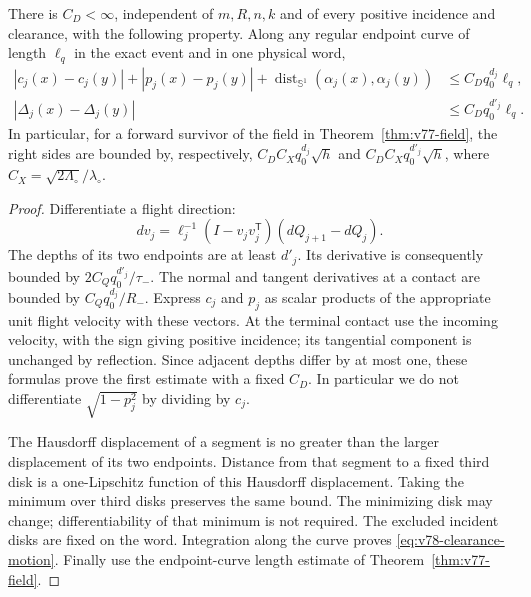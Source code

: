 \begin{theorem}
\label{thm:v78-margins}
There is $C_D<\infty$, independent of $m,R,n,k$ and of every
positive incidence and clearance, with the following property.
Along any regular endpoint curve of length $\ell_q$ in the exact
event and in one physical word,
\begin{align}
 |c_j(x)-c_j(y)|+|p_j(x)-p_j(y)|
      +\operatorname{dist}_{\mathbb S^1}(\alpha_j(x),\alpha_j(y))
       &\le C_Dq_0^{d_j}\ell_q,\label{eq:v78-contact-motion}\\
 |\Delta_j(x)-\Delta_j(y)|&\le C_Dq_0^{d'_j}\ell_q.
                                      \label{eq:v78-clearance-motion}
\end{align}
In particular, for a forward survivor of the field in
Theorem~\ref{thm:v77-field}, the right sides are bounded by,
respectively, $C_D C_Xq_0^{d_j}\sqrt h$ and
$C_D C_Xq_0^{d'_j}\sqrt h$, where
$C_X=\sqrt{2\Lambda_\circ}/\lambda_\circ$.
\end{theorem}
\begin{proof}
Differentiate a flight direction:
\[
 dv_j=\ell_j^{-1}(I-v_jv_j^{\mathsf T})(dQ_{j+1}-dQ_j).
\]
The depths of its two endpoints are at least $d'_j$. Its derivative
is consequently bounded by $2C_Qq_0^{d'_j}/\tau_-$.
The normal and tangent derivatives at a contact are bounded by
$C_Qq_0^{d_j}/R_-$. Express $c_j$ and $p_j$ as scalar products
of the appropriate unit flight velocity with these vectors. At the
terminal contact use the incoming velocity, with the sign giving
positive incidence; its tangential component is unchanged by
reflection. Since adjacent depths differ by at most one, these
formulas prove the first estimate with a fixed $C_D$. In particular
we do not differentiate $\sqrt{1-p_j^2}$ by dividing by $c_j$.

The Hausdorff displacement of a segment is no greater than the
larger displacement of its two endpoints. Distance from that segment
to a fixed third disk is a one-Lipschitz function of this Hausdorff
displacement. Taking the minimum over third disks preserves the
same bound. The minimizing disk may change; differentiability of
that minimum is not required. The excluded incident disks are fixed
on the word. Integration along the curve proves
\eqref{eq:v78-clearance-motion}. Finally use the endpoint-curve
length estimate of Theorem~\ref{thm:v77-field}.
\end{proof}

